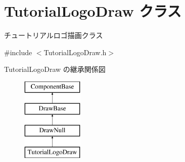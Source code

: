 \hypertarget{class_tutorial_logo_draw}{}\section{Tutorial\+Logo\+Draw クラス}
\label{class_tutorial_logo_draw}


チュートリアルロゴ描画クラス  




{\ttfamily \#include $<$Tutorial\+Logo\+Draw.\+h$>$}

Tutorial\+Logo\+Draw の継承関係図\begin{figure}[H]
\begin{center}
\leavevmode
\includegraphics[height=4.000000cm]{class_tutorial_logo_draw}
\end{center}
\end{figure}
